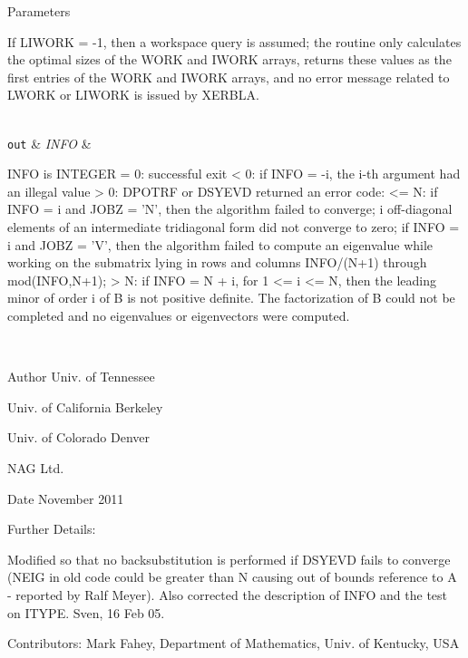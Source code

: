 \begin{DoxyParams}[1]{Parameters}
\begin{DoxyVerb}
          If LIWORK = -1, then a workspace query is assumed; the
          routine only calculates the optimal sizes of the WORK and
          IWORK arrays, returns these values as the first entries of
          the WORK and IWORK arrays, and no error message related to
          LWORK or LIWORK is issued by XERBLA.\end{DoxyVerb}
\\
\hline
\mbox{\tt out}  & {\em I\+N\+F\+O} & \begin{DoxyVerb}          INFO is INTEGER
          = 0:  successful exit
          < 0:  if INFO = -i, the i-th argument had an illegal value
          > 0:  DPOTRF or DSYEVD returned an error code:
             <= N:  if INFO = i and JOBZ = 'N', then the algorithm
                    failed to converge; i off-diagonal elements of an
                    intermediate tridiagonal form did not converge to
                    zero;
                    if INFO = i and JOBZ = 'V', then the algorithm
                    failed to compute an eigenvalue while working on
                    the submatrix lying in rows and columns INFO/(N+1)
                    through mod(INFO,N+1);
             > N:   if INFO = N + i, for 1 <= i <= N, then the leading
                    minor of order i of B is not positive definite.
                    The factorization of B could not be completed and
                    no eigenvalues or eigenvectors were computed.\end{DoxyVerb}
 \\
\hline
\end{DoxyParams}
\begin{DoxyAuthor}{Author}
Univ. of Tennessee 

Univ. of California Berkeley 

Univ. of Colorado Denver 

N\+A\+G Ltd. 
\end{DoxyAuthor}
\begin{DoxyDate}{Date}
November 2011 
\end{DoxyDate}
\begin{DoxyParagraph}{Further Details\+: }
\begin{DoxyVerb}  Modified so that no backsubstitution is performed if DSYEVD fails to
  converge (NEIG in old code could be greater than N causing out of
  bounds reference to A - reported by Ralf Meyer).  Also corrected the
  description of INFO and the test on ITYPE. Sven, 16 Feb 05.\end{DoxyVerb}
 
\end{DoxyParagraph}
\begin{DoxyParagraph}{Contributors\+: }
Mark Fahey, Department of Mathematics, Univ. of Kentucky, U\+S\+A 
\end{DoxyParagraph}
\hypertarget{group__doubleSYeigen_ga51bef2d9d58cfff3f1bac9143ccc85b8}{}
